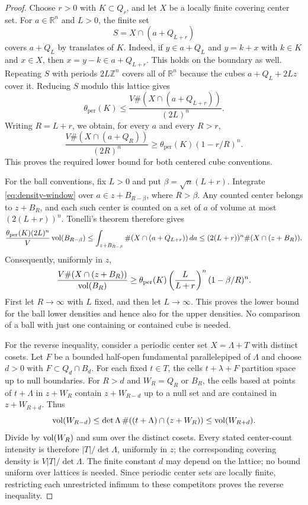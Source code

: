 \begin{proof}
Choose $r>0$ with $K\subset Q_r$, and let $X$ be a locally finite
covering center set. For $a\in\mathbb R^n$ and $L>0$, the finite set
\[
 S=X\cap(a+Q_{L+r})
\]
covers $a+Q_L$ by translates of $K$. Indeed, if $y\in a+Q_L$ and
$y=k+x$ with $k\in K$ and $x\in X$, then $x=y-k\in a+Q_{L+r}$.
This holds on the boundary as well. Repeating $S$ with periods
$2L\mathbb Z^n$ covers all of $\mathbb R^n$ because the cubes
$a+Q_L+2Lz$ cover it. Reducing $S$ modulo this lattice gives
\begin{equation}
 \theta_{\mathrm{per}}(K)
 \le \frac{V\#(X\cap(a+Q_{L+r}))}{(2L)^n}.
 \label{eq:density-window}
\end{equation}
Writing $R=L+r$, we obtain, for every $a$ and every $R>r$,
\begin{equation}
 \frac{V\#(X\cap(a+Q_R))}{(2R)^n}
 \ge \theta_{\mathrm{per}}(K)(1-r/R)^n.
 \label{eq:density-cubes}
\end{equation}
This proves the required lower bound for both centered cube conventions.

For the ball conventions, fix $L>0$ and put
$\beta=\sqrt n(L+r)$. Integrate \eqref{eq:density-window} over
$a\in z+B_{R-\beta}$, where $R>\beta$. Any counted center belongs to $z+B_R$,
and each such center is counted on a set of $a$ of volume at most
$(2(L+r))^n$. Tonelli's theorem therefore gives
\[
 \frac{\theta_{\mathrm{per}}(K)(2L)^n}{V}\operatorname{vol}(B_{R-\beta})
 \le \int_{z+B_{R-\beta}}\#(X\cap(a+Q_{L+r}))\,da
 \le (2(L+r))^n\#(X\cap(z+B_R)).
\]
Consequently, uniformly in $z$,
\[
 \frac{V\#(X\cap(z+B_R))}{\operatorname{vol}(B_R)}
 \ge \theta_{\mathrm{per}}(K)
       \left(\frac{L}{L+r}\right)^n(1-\beta/R)^n.
\]
First let $R\to\infty$ with $L$ fixed, and then let $L\to\infty$.
This proves the lower bound for the ball lower densities and hence also
for the upper densities. No comparison of a ball with just one
containing or contained cube is needed.

For the reverse inequality, consider a periodic center set
$X=\Lambda+T$ with distinct cosets. Let $F$ be a bounded half-open
fundamental parallelepiped of $\Lambda$ and choose $d>0$ with
$F\subset Q_d\cap B_d$. For each fixed $t\in T$, the cells
$t+\lambda+F$ partition space up to null boundaries. For $R>d$ and
$W_R=Q_R$ or $B_R$, the cells based at points of $t+\Lambda$ in
$z+W_R$ contain $z+W_{R-d}$ up to a null set and are contained in
$z+W_{R+d}$. Thus
\[
 \operatorname{vol}(W_{R-d})\le
 \det\Lambda\,\#((t+\Lambda)\cap(z+W_R))
 \le\operatorname{vol}(W_{R+d}).
\]
Divide by $\operatorname{vol}(W_R)$ and sum over the distinct cosets. Every stated
center-count intensity is therefore $|T|/\det\Lambda$, uniformly in $z$;
the corresponding covering density is $V|T|/\det\Lambda$.
The finite constant $d$ may depend on the lattice; no bound uniform over
lattices is needed. Since periodic center sets are locally finite,
restricting each unrestricted infimum to these competitors proves the
reverse inequality.
\end{proof}

